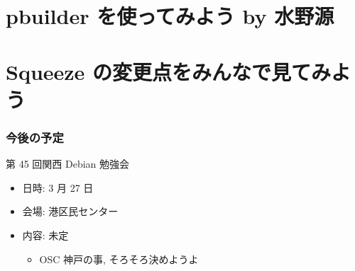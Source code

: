 \documentclass[cjk,dvipdfmx,12pt,%
hyperref={bookmarks=true,bookmarksnumbered=true,bookmarksopen=false,%
colorlinks=false,%
pdftitle={第 44 回 関西 Debian 勉強会},%
pdfauthor={倉敷・のがた・佐々木},%
pdfsubject={資料},%
}]{beamer}
\begin{document}

\section{pbuilder を使ってみよう by 水野源}



\section{Squeeze の変更点をみんなで見てみよう}



\begin{frame}[fragile]
\frametitle{今後の予定}


\begin{block}{第 45 回関西 Debian 勉強会}
\begin{itemize}
  \item 日時: 3 月 27 日
  \item 会場: 港区民センター
  \item 内容: 未定
  \begin{itemize}
    \item OSC 神戸の事, そろそろ決めようよ
  \end{itemize}
\end{itemize}
\end{block}


\end{frame}



\takahashi[50]{  }
\end{document}
